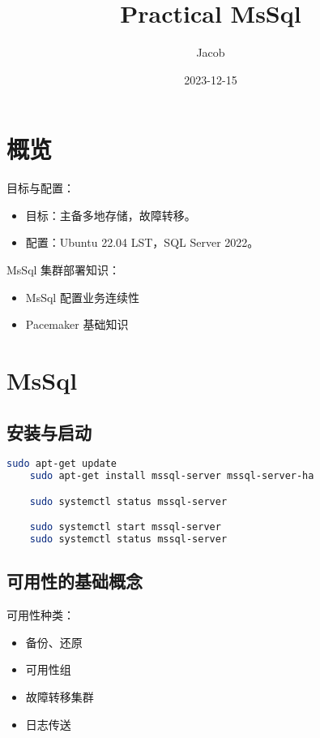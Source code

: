 \documentclass[UTF8]{ctexart}
\title{Practical MsSql}
\author{Jacob}
\date{2023-12-15}
\begin{document}
\maketitle

\section{概览}

目标与配置：

\begin{itemize}
	\item 目标：主备多地存储，故障转移。
	\item 配置：Ubuntu 22.04 LST，SQL Server 2022。
\end{itemize}

MsSql 集群部署知识：

\begin{itemize}
	\item MsSql 配置业务连续性
	\item Pacemaker 基础知识
\end{itemize}

\newpage
\section{MsSql}

\subsection{安装与启动}

\begin{lstlisting}[language=Bash]
	sudo apt-get update
	sudo apt-get install mssql-server mssql-server-ha

	sudo systemctl status mssql-server

	sudo systemctl start mssql-server
	sudo systemctl status mssql-server
\end{lstlisting}

\subsection{可用性的基础概念}

可用性种类：

\begin{itemize}
	\item 备份、还原
	\item 可用性组
	\item 故障转移集群
	\item 日志传送
\end{itemize}
\end{document}
